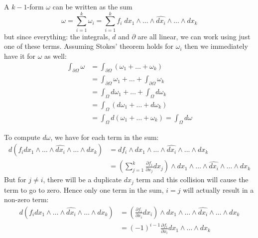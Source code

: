 A $k-1$-form $\omega$ can be written as the sum
\begin{equation}
	\omega 
		= \sum_{i=1}^k \omega_i 
		= \sum_{i=1}^k f_i \; dx_1 \wedge \ldots \wedge \widehat{dx_i} \wedge  \ldots \wedge dx_k
\end{equation}
but since everything: the integrals, $d$ and $\partial$ are all linear, we can work using just one of these terms.
Assuming Stokes' theorem holds for $\omega_i$ then we immediately have it for $\omega$ as well:
\begin{align*}
	\int_{\partial\Omega} \omega 
	&= \int_{\partial \Omega} (\omega_1 + \ldots + \omega_k) \\
	&= \int_{\partial\Omega} \omega_1 + \ldots + \int_{\partial\Omega} \omega_k  \\
	&= \int_{\Omega} d\omega_1 + \ldots + \int_\Omega d\omega_k \\
	&= \int_\Omega (d\omega_1 + \ldots + d\omega_k)\\
	&= \int_\Omega d(\omega_1 + \ldots + \omega_k) = \int_\Omega d\omega
\end{align*}



To compute $d\omega$, we have for each term in the sum:
\begin{align*}
	d \left( f_i dx_1 \wedge \ldots \wedge \widehat{dx_i} \wedge  \ldots \wedge dx_k \right) 
 		&= df_i \wedge dx_1 \wedge \ldots \wedge \widehat{dx_i} \wedge  \ldots \wedge dx_k \\ 
 		&= \left( \sum_{j=1}^k \frac{\partial f_i}{\partial x_j} dx_j \right)
 			\wedge dx_1 \wedge \ldots \wedge \widehat{dx_i} \wedge  \ldots \wedge dx_k
\end{align*}
But for $j \neq i$, there will be a duplicate $dx_j$ term and this collision will cause the term to go to zero.
Hence only one term in the sum, $i=j$ will actually result in a non-zero term:
\begin{align*}
	d \left( f_i dx_1 \wedge \ldots \wedge \widehat{dx_i} \wedge  \ldots \wedge dx_k \right) 
 		&= \left(\frac{\partial f_i}{\partial x_i} dx_i \right)
 			\wedge dx_1 \wedge \ldots \wedge \hat{dx_i} \wedge  \ldots \wedge dx_k \\ 
		&= (-1)^{i-1} \frac{\partial f_i}{\partial x_i}
 			 dx_1 \wedge \ldots \wedge dx_k
\end{align*}



